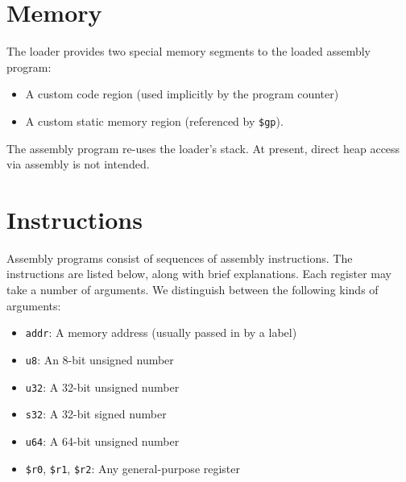 \documentclass{article}
\begin{document}
\section{Memory}
The loader provides two special memory segments to the loaded assembly program:
\begin{itemize}
\item A custom code region (used implicitly by the program counter)
\item A custom static memory region (referenced by \texttt{\$gp}).
\end{itemize}
The assembly program re-uses the loader's stack.  At present, direct heap access via assembly is not intended.

\section{Instructions}

Assembly programs consist of sequences of assembly instructions.  The instructions are listed below, along with brief explanations.
Each register may take a number of arguments.  We distinguish between the following kinds of arguments:
\begin{itemize}
  \item \texttt{addr}: A memory address (usually passed in by a label)
  \item \texttt{u8}: An 8-bit unsigned number
  \item \texttt{u32}: A 32-bit unsigned number
  \item \texttt{s32}: A 32-bit signed number
  \item \texttt{u64}: A 64-bit unsigned number
  \item \texttt{\$r0}, \texttt{\$r1}, \texttt{\$r2}: Any general-purpose register
\end{itemize}
\end{document}
